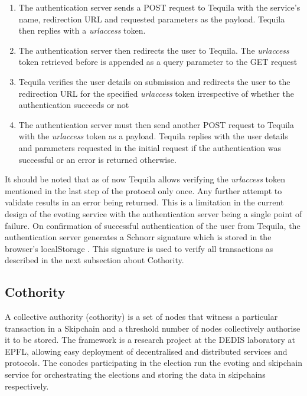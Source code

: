 \begin{enumerate}
  \item The authentication server sends a POST request to Tequila with the service’s name, redirection URL and requested parameters as the payload. Tequila then replies with a \textit{urlaccess} token.
  \item The authentication server then redirects the user to Tequila. The \textit{urlaccess} token retrieved before is appended as a query parameter to the GET request
  \item Tequila verifies the user details on submission and redirects the user to the redirection URL for the specified \textit{urlaccess} token irrespective of whether the authentication succeeds or not
  \item The authentication server must then send another POST request to Tequila with the \textit{urlaccess} token as a payload. Tequila replies with the user details and parameters requested in the initial request if the authentication was successful or an error is returned otherwise.
\end{enumerate}

It should be noted that as of now Tequila allows verifying the \textit{urlaccess} token mentioned in the last step of the protocol only once. Any further attempt to validate results in an error being returned. This is a limitation in the current design of the evoting service with the authentication server being a single point of failure. On confirmation of successful authentication of the user from Tequila, the authentication server generates a Schnorr signature which is stored in the browser’s localStorage \cite{localStorage}. This signature is used to verify all transactions as described in the next subsection about Cothority.

\subsection{Cothority}

A collective authority (cothority) \cite{cothority} is a set of nodes that witness a particular transaction in a Skipchain and a threshold number of nodes collectively authorise it to be stored. The framework is a research project at the DEDIS laboratory at EPFL, allowing easy deployment of decentralised and distributed services and protocols. The conodes participating in the election run the evoting and skipchain service for orchestrating the elections and storing the data in skipchains respectively.

